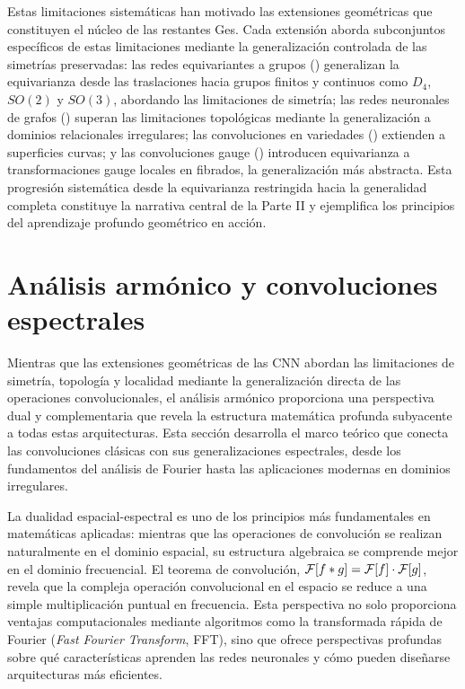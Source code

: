 Estas limitaciones sistem\'aticas han motivado las extensiones geom\'etricas que
constituyen el n\'ucleo de las restantes Ges. Cada extensi\'on aborda
subconjuntos espec\'ificos de estas limitaciones mediante la generalizaci\'on
controlada de las simetr\'ias preservadas: las redes equivariantes a grupos
() generalizan la equivarianza desde las traslaciones hacia
grupos finitos y continuos como $D_4$, $SO(2)$ y $SO(3)$, abordando las
limitaciones de simetr\'ia; las redes neuronales de grafos ()
superan las limitaciones topol\'ogicas mediante la generalizaci\'on a dominios
relacionales irregulares; las convoluciones en variedades ()
extienden a superficies curvas; y las convoluciones gauge ()
introducen equivarianza a transformaciones gauge locales en fibrados, la
generalizaci\'on m\'as abstracta. Esta progresi\'on sistem\'atica desde la
equivarianza restringida hacia la generalidad completa constituye la narrativa
central de la Parte II y ejemplifica los principios del aprendizaje profundo
geom\'etrico en acci\'on.

\section{An\'alisis arm\'onico y convoluciones espectrales}
\label{sec:grids:harmonic}

Mientras que las extensiones geom\'etricas de las CNN abordan las limitaciones
de simetr\'ia, topolog\'ia y localidad mediante la generalizaci\'on directa de
las operaciones convolucionales, el an\'alisis arm\'onico proporciona una
perspectiva dual y complementaria que revela la estructura matem\'atica profunda
subyacente a todas estas arquitecturas. Esta secci\'on desarrolla el marco
te\'orico que conecta las convoluciones cl\'asicas con sus generalizaciones
espectrales, desde los fundamentos del an\'alisis de Fourier hasta las
aplicaciones modernas en dominios irregulares.

La dualidad espacial-espectral es uno de los principios m\'as fundamentales en
matem\'aticas aplicadas: mientras que las operaciones de convoluci\'on se
realizan naturalmente en el dominio espacial, su estructura algebraica se
comprende mejor en el dominio frecuencial. El teorema de convoluci\'on,
$\mathcal{F}[f * g] = \mathcal{F}[f] \cdot \mathcal{F}[g]$, revela que la compleja operaci\'on
convolucional en el espacio se reduce a una simple multiplicaci\'on puntual en
frecuencia. Esta perspectiva no solo proporciona ventajas computacionales
mediante algoritmos como la transformada r\'apida de Fourier (\emph{Fast Fourier
Transform}, FFT), sino que ofrece perspectivas profundas sobre qu\'e
caracter\'isticas aprenden las redes neuronales y c\'omo pueden dise\~narse
arquitecturas m\'as eficientes.


